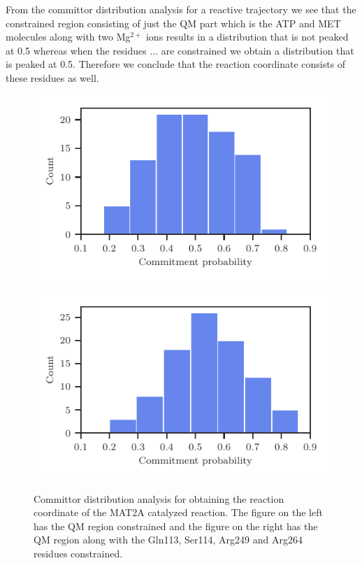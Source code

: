 \documentclass[journal=jpcbfk,manuscript=article,layout=traditional]{achemso}
\begin{document}
From the committor distribution analysis for a reactive trajectory we see that the 
constrained region consisting of just the QM part which is the ATP and MET molecules 
along with two Mg$^{2+}$ ions results in a distribution that is not peaked 
at 0.5 whereas when the residues ... are constrained we obtain a distribution 
that is peaked at 0.5. Therefore we conclude that the reaction coordinate consists
of these residues as well. 
\begin{figure}[ht!]
\centering
\begin{minipage}[b]{0.45\linewidth}
\includegraphics[width=\textwidth]{figures/comm-60-mat2a-nocons.pdf}
\label{fig:minipage1}
\end{minipage}
\quad
\begin{minipage}[b]{0.45\linewidth}
\includegraphics[width=\textwidth]{figures/comm-60-mat2a.pdf}
\label{fig:minipage2}
\end{minipage}
\caption{Committor distribution analysis for obtaining the reaction coordinate of the 
MAT2A catalyzed reaction. The figure on the left has the QM region constrained and the figure 
on the right has the QM region along with the Gln113, Ser114, Arg249 and Arg264 residues constrained.}
\end{figure}
\end{document}
